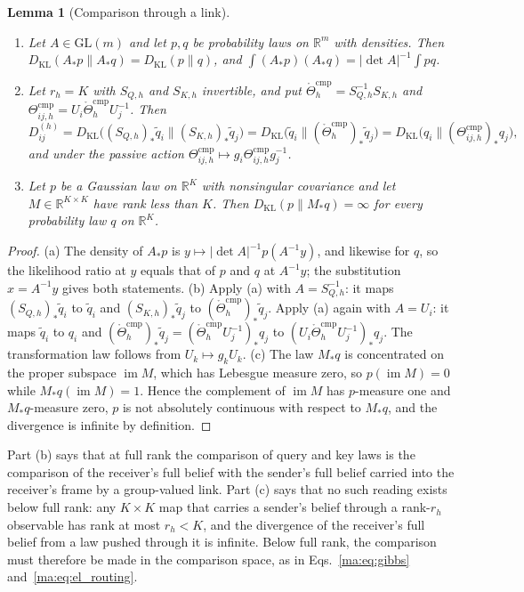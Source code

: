 \documentclass[11pt]{article}
\newtheorem{lemma}[theorem]{Lemma}
\theoremstyle{definition}
\theoremstyle{remark}
\providecommand{\GL}{\mathrm{GL}}
\providecommand{\KL}{D_{\mathrm{KL}}}
\newcommand{\R}{\mathbb R}
\newcommand{\Thr}{\mathring\Theta^{\mathrm{cmp}}}
\newcommand{\Thcmp}{\Theta^{\mathrm{cmp}}}
\newcommand{\qt}{\widetilde q}
\newcommand{\im}{\operatorname{im}}
\begin{document}
\begin{lemma}[Comparison through a link]
\label{ma:lem:link}
\begin{enumerate}
\item[(a)] Let $A\in\GL(m)$ and let $p,q$ be probability laws on $\R^m$ with densities. Then $\KL(A_*p\|A_*q)=\KL(p\|q)$, and $\int(A_*p)(A_*q)=|\det A|^{-1}\int pq$.
\item[(b)] Let $r_h=K$ with $S_{Q,h}$ and $S_{K,h}$ invertible, and put $\Thr_h=S_{Q,h}^{-1}S_{K,h}$ and $\Thcmp_{ij,h}=U_i\Thr_hU_j^{-1}$. Then
\begin{equation}
D^{(h)}_{ij}=\KL\bigl((S_{Q,h})_*\qt_i\big\|(S_{K,h})_*\qt_j\bigr)=\KL\bigl(\qt_i\big\|(\Thr_h)_*\qt_j\bigr)=\KL\bigl(q_i\big\|(\Thcmp_{ij,h})_*q_j\bigr),
\label{ma:eq:link_identity}
\end{equation}
and under the passive action $\Thcmp_{ij,h}\mapsto g_i\Thcmp_{ij,h}g_j^{-1}$.
\item[(c)] Let $p$ be a Gaussian law on $\R^K$ with nonsingular covariance and let $M\in\R^{K\times K}$ have rank less than $K$. Then $\KL(p\|M_*q)=\infty$ for every probability law $q$ on $\R^K$.
\end{enumerate}
\end{lemma}

\begin{proof}
(a) The density of $A_*p$ is $y\mapsto|\det A|^{-1}p(A^{-1}y)$, and likewise for $q$, so the likelihood ratio at $y$ equals that of $p$ and $q$ at $A^{-1}y$; the substitution $x=A^{-1}y$ gives both statements. (b) Apply (a) with $A=S_{Q,h}^{-1}$: it maps $(S_{Q,h})_*\qt_i$ to $\qt_i$ and $(S_{K,h})_*\qt_j$ to $(\Thr_h)_*\qt_j$. Apply (a) again with $A=U_i$: it maps $\qt_i$ to $q_i$ and $(\Thr_h)_*\qt_j=(\Thr_hU_j^{-1})_*q_j$ to $(U_i\Thr_hU_j^{-1})_*q_j$. The transformation law follows from $U_k\mapsto g_kU_k$. (c) The law $M_*q$ is concentrated on the proper subspace $\im M$, which has Lebesgue measure zero, so $p(\im M)=0$ while $M_*q(\im M)=1$. Hence the complement of $\im M$ has $p$-measure one and $M_*q$-measure zero, $p$ is not absolutely continuous with respect to $M_*q$, and the divergence is infinite by definition.
\end{proof}

Part (b) says that at full rank the comparison of query and key laws is the comparison of the receiver's full belief with the sender's full belief carried into the receiver's frame by a group-valued link. Part (c) says that no such reading exists below full rank: any $K\times K$ map that carries a sender's belief through a rank-$r_h$ observable has rank at most $r_h<K$, and the divergence of the receiver's full belief from a law pushed through it is infinite. Below full rank, the comparison must therefore be made in the comparison space, as in Eqs.~\eqref{ma:eq:gibbs} and~\eqref{ma:eq:el_routing}.
\end{document}
